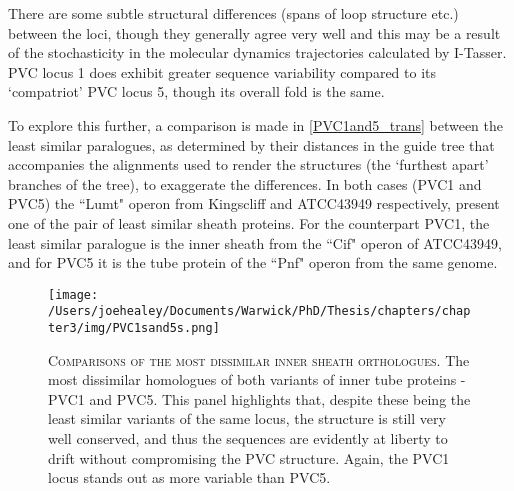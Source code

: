 
There are some subtle structural differences (spans of loop structure etc.)  between the loci, though they generally agree very well and this may be a result of the stochasticity in the molecular dynamics trajectories calculated by I-Tasser. PVC locus 1 does exhibit greater sequence variability compared to its `compatriot' PVC locus 5, though its overall fold is the same.

To explore this further, a comparison is made in \vref{PVC1and5_trans} between the least similar paralogues, as determined by their distances in the guide tree that accompanies the alignments used to render the structures (the `furthest apart' branches of the tree), to exaggerate the differences. In both cases (PVC1 and PVC5) the ``Lumt" operon from \Pasy{} Kingscliff and ATCC43949 respectively, present one of the pair of least similar sheath proteins. For the counterpart PVC1, the least similar paralogue is the inner sheath from the ``Cif" operon of \Pasy{} ATCC43949, and for PVC5 it is the tube protein of the ``Pnf" operon from the same genome.

\begin{figure}[h]
 \thispagestyle{augment}
 \centering
 \texttt{[image: /Users/joehealey/Documents/Warwick/PhD/Thesis/chapters/chapter3/img/PVC1sand5s.png]}
 \captionsetup{singlelinecheck=off, justification=justified, font=footnotesize, aboveskip=10pt}
 \caption[Comparisons of the most dissimilar inner sheath proteins]{\textsc{\normalsize Comparisons of the most dissimilar inner sheath orthologues.}\vspace{0.1cm} \newline The most dissimilar homologues of both variants of inner tube proteins - PVC1 and PVC5. This panel highlights that, despite these being the least similar variants of the same locus, the structure is still very well conserved, and thus the sequences are evidently at liberty to drift without compromising the PVC structure. Again, the PVC1 locus stands out as more variable than PVC5. }
 \label{PVC1and5_trans}
\end{figure}


